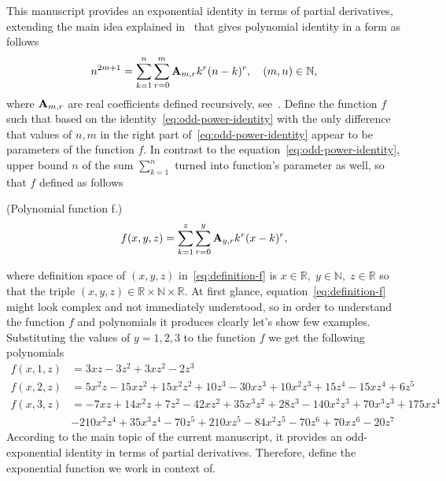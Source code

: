 This manuscript provides an exponential identity in terms of partial derivatives,
extending the main idea explained in~\cite{kolosov_2022} that gives polynomial identity in a form as follows
\begin{equation}
    n^{2m+1} = \sum_{k=1}^{n} \sum_{r=0}^{m} {\mathbf{A}} \sb{m,r} k^r (n-k)^r, \quad (m,n) \in \mathbb{N},
    \label{eq:odd-power-identity}
\end{equation}
where ${\mathbf{A}} \sb{m,r}$ are real coefficients defined recursively, see~\cite{kolosov2016link}.
Define the function $f$ such that based on the identity~\eqref{eq:odd-power-identity} with the only difference that
values of $n, m$ in the right part of~\eqref{eq:odd-power-identity} appear to be parameters of the function $f$.
In contrast to the equation~\eqref{eq:odd-power-identity}, upper bound $n$ of the sum $\sum_{k=1}^{n}$ turned into function's
parameter as well, so that $f$ defined as follows
\begin{definition} (Polynomial function f.)
    \begin{equation}
        f(x, y, z) = \sum_{k=1}^{z} \sum_{r=0}^{y} {\mathbf{A}} \sb{y,r} k^r (x-k)^r,
        \label{eq:definition-f}
    \end{equation}
\end{definition}
where definition space of $(x,y,z)$ in~\eqref{eq:definition-f} is $x\in \mathbb{R}, \; y\in\mathbb{N}, \; z\in\mathbb{R}$ so that
the triple $(x,y,z) \in \mathbb{R} \times \mathbb{N} \times \mathbb{R}$.
At first glance, equation~\eqref{eq:definition-f} might look complex and not immediately understood, so in order to understand
the function $f$ and polynomials it produces clearly let's show few examples.
Substituting the values of $y=1,2,3$ to the function $f$ we get the following polynomials
\begin{align*}
    f(x, 1, z) &= 3 x z - 3 z^2 + 3 x z^2 - 2 z^3 \\
    f(x, 2, z) &= 5 x^2 z - 15 x z^2 + 15 x^2 z^2 + 10 z^3 - 30 x z^3 + 10 x^2 z^3 +
    15 z^4 - 15 x z^4 + 6 z^5 \\
    f(x, 3, z) &= -7 x z + 14 x^2 z + 7 z^2 - 42 x z^2 + 35 x^3 z^2 + 28 z^3 - 140 x^2 z^3 + 70 x^3 z^3 + 175 x z^4 \\
    &- 210 x^2 z^4 + 35 x^3 z^4 - 70 z^5 + 210 x z^5 - 84 x^2 z^5 - 70 z^6 + 70 x z^6 - 20 z^7
\end{align*}
According to the main topic of the current manuscript, it provides an odd-exponential identity
in terms of partial derivatives.
Therefore, define the exponential function we work in context of.
